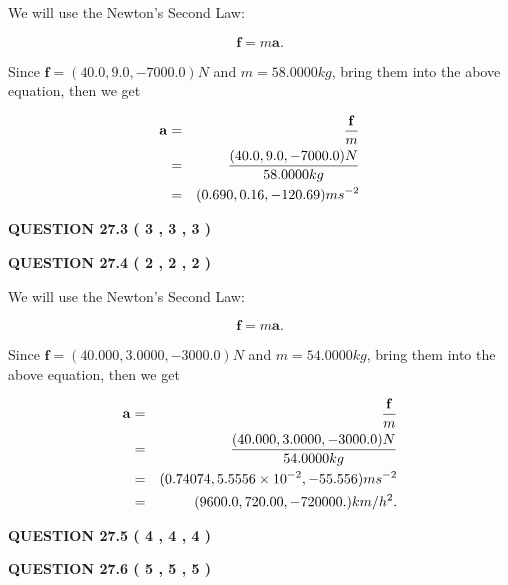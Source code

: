 \documentclass[12pt]{article}
\begin{document}
 
 

We will use the Newton's Second Law:
 
\[
\mathbf{f}=m\mathbf{a}.
\]
 
Since $\mathbf{f}= %
(40.0 , 9.0 , -7000.0) N$
and $m= %
58.0000kg$, bring them into the above equation, then we get
 
\begin{eqnarray*}
\mathbf{a}&=&\frac{\mathbf{f}}m  \\
&=&\frac{ %
(40.0 , 9.0 , -7000.0) N}{ %
58.0000kg}  \\
&=& %
(0.690 , 0.16 , -120.69) ms^{-2}
\end{eqnarray*}
 
 
 
  
\vspace{0.2in}
  
{\textbf{\Large{QUESTION
27.3 
 (           3 ,           3 ,           3 )
}}}
  
  
  
\vspace{0.2in}
  
{\textbf{\Large{QUESTION
27.4 
 (           2 ,           2 ,           2 )
}}}
  
  
 
 

We will use the Newton's Second Law:
 
\[
\mathbf{f}=m\mathbf{a}.
\]
 
Since $\mathbf{f}=( %
40.000,  %
3.0000,  %
-3000.0 )N$
and $m= %
54.0000kg$, bring them into the above equation, then we get
 
\begin{eqnarray*}
\mathbf{a}&=&\frac{\mathbf{f}}m  \\
&=&\frac{(
40.000 ,
3.0000 ,
-3000.0 )N
}{ %
54.0000 kg}  \\
&=&(
0.74074 ,
5.5556 \times 10^{-2},
-55.556
)ms^{-2} \\
&=&(
9600.0 ,
720.00 ,
-720000.
)km/h^2.
\end{eqnarray*}
 
 
 
  
\vspace{0.2in}
  
{\textbf{\Large{QUESTION
27.5 
 (           4 ,           4 ,           4 )
}}}
  
  
  
\vspace{0.2in}
  
{\textbf{\Large{QUESTION
27.6 
 (           5 ,           5 ,           5 )
}}}
  
\end{document}
